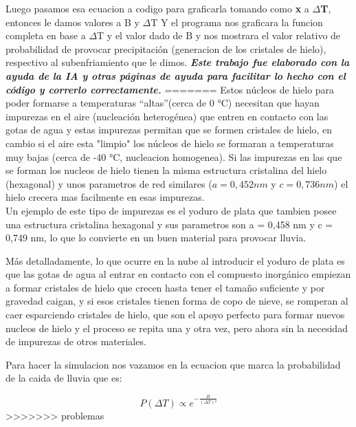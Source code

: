 \documentclass[12pt,a4paper]{article}
\begin{document}
Luego pasamos esa ecuacion a codigo para graficarla tomando como {\bfseries x} a {\bfseries $\Delta$T}, entonces le damos valores a B y $\Delta$T Y el programa nos graficara la funcion completa en base a $\Delta$T y el valor dado de B y nos mostrara el valor relativo de probabilidad de provocar precipitación (generacion de los cristales de hielo), respectivo al subenfriamiento que le dimos.
\vfill
\textit{\textbf{Este trabajo fue elaborado con la ayuda de la IA y otras páginas de ayuda para facilitar lo hecho con el código y correrlo correctamente.}}
=======
Estos núcleos de hielo para poder formarse a temperaturas \textquotedblleft altas\textquotedblright (cerca de 0 °C) necesitan que hayan impurezas en el aire (nucleación heterogénea) que entren en contacto con las gotas de agua y estas impurezas permitan que se formen cristales de hielo, en cambio si el aire esta "limpio" los núcleos de hielo se formaran a temperaturas muy bajas (cerca de -40 °C, nucleacion homogenea). Si las impurezas en las que se forman los nucleos de hielo tienen la misma estructura cristalina del hielo (hexagonal) y unos parametros de red similares ($a=0,452 nm$ y $c=0,736 nm$) el hielo crecera mas facilmente en esas impurezas.\\Un ejemplo de este tipo de impurezas es el yoduro de plata que tambien posee una estructura cristalina hexagonal y sus parametros son a = 0,458 nm y c = 0,749 nm, lo que lo convierte en un buen material para provocar lluvia.

Más detalladamente, lo que ocurre en la nube al introducir el yoduro de plata es que las gotas de agua al entrar en contacto con el compuesto inorgánico empiezan a formar cristales de hielo que crecen hasta tener el tamaño suficiente y por gravedad caigan, y si esos cristales tienen forma de copo de nieve, se romperan al caer esparciendo cristales de hielo, que son el apoyo perfecto para formar nuevos nucleos de hielo y el proceso se repita una y otra vez, pero ahora sin la necesidad de impurezas de otros materiales.

Para hacer la simulacion nos vazamos en la ecuacion que marca la probabilidad de la caida de lluvia que es:

\begin{equation}
    P(\Delta T) \propto  e^{-\frac{B}{(\Delta T)²} }
\end{equation}
>>>>>>> problemas
\end{document}
